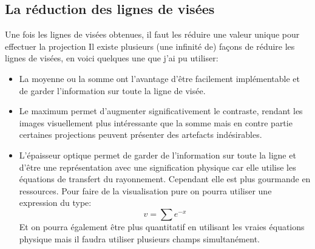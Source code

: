 \subsection{La réduction des lignes de visées}

Une fois les lignes de visées obtenues, il faut les réduire une valeur unique pour effectuer la projection
Il existe plusieurs (une infinité de) façons de réduire les lignes de visées, en voici quelques une que j'ai pu utiliser:

\begin{itemize}
\item La moyenne ou la somme ont l'avantage d'être facilement implémentable et de garder l'information sur toute la ligne de visée.

\item Le maximum permet d'augmenter significativement le contraste, rendant les images visuellement plus intéressante que la somme mais en contre partie certaines projections peuvent présenter des artefacts indésirables.

\item L'épaisseur optique permet de garder de l'information sur toute la ligne et d'être une représentation avec une signification physique car elle utilise les équations de transfert du rayonnement.
Cependant elle est plus gourmande en ressources.
Pour faire de la visualisation pure on pourra utiliser une expression du type:
\begin{equation}
v= \sum e^{-x}
\label{eq:epop}
\end{equation}
Et on pourra également être plus quantitatif en utilisant les vraies équations physique mais il faudra utiliser plusieurs champs simultanément. %
\end{itemize}




